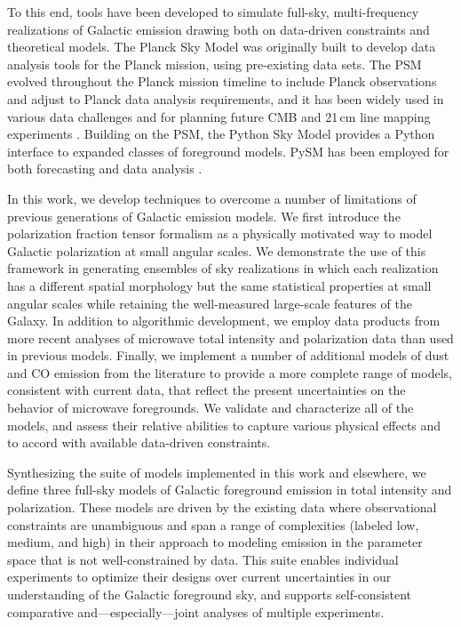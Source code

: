 \documentclass[twocolumn]{aastex631}
\begin{document}
To this end, tools have been developed to simulate full-sky, multi-frequency realizations of Galactic emission drawing both on data-driven constraints and theoretical models. The Planck Sky Model \citep[PSM;][]{delabrouille2012} was originally built to develop data analysis tools for the Planck mission, using pre-existing data sets. The PSM evolved throughout the Planck mission timeline to include Planck observations and adjust to Planck data analysis requirements, and it has been widely used in various data challenges and for planning future CMB and 21\,cm line mapping experiments \citep[e.g.,][]{Remazeilles:2018, Fornazier:2022, Ghosh:2022}. Building on the PSM, the Python Sky Model \citep[PySM;][]{Thorne:2017} provides a Python interface to expanded classes of foreground models. PySM has been employed for both forecasting \citep[e.g.,][]{Abazajian:2022, Hensley:2022, CCAT-PrimeCollaboration:2023, Wolz:2024} and data analysis \citep[e.g.,][]{Vacher:2023, Ade:2025}.

In this work, we develop techniques to overcome a number of limitations of previous generations of Galactic emission models. We first introduce the polarization fraction tensor formalism as a physically motivated way to model Galactic polarization at small angular scales. We demonstrate the use of this framework in generating ensembles of sky realizations in which each realization has a different spatial morphology but the same statistical properties at small angular scales while retaining the well-measured large-scale features of the Galaxy. In addition to algorithmic development, we employ data products from more recent analyses of microwave total intensity and polarization data than used in previous models. Finally, we implement a number of additional models of dust and CO emission from the literature to provide a more complete range of models, consistent with current data, that reflect the present uncertainties on the behavior of microwave foregrounds. We validate and characterize all of the models, and assess their relative abilities to capture various physical effects and to accord with available data-driven constraints.

Synthesizing the suite of models implemented in this work and elsewhere, we define three full-sky models of Galactic foreground emission in total intensity and polarization. These models are driven by the existing data where observational constraints are unambiguous and span a range of complexities (labeled low, medium, and high) in their approach to modeling emission in the parameter space that is not well-constrained by data. This suite enables individual experiments to optimize their designs over current uncertainties in our understanding of the Galactic foreground sky, and supports self-consistent comparative and---especially---joint analyses of multiple experiments.
\end{document}
